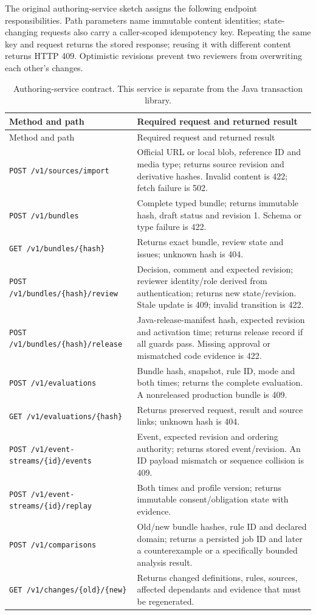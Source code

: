 The original authoring-service sketch assigns the following endpoint responsibilities. Path parameters name
immutable content identities; state-changing requests also carry a caller-scoped
idempotency key. Repeating the same key and request returns the stored response;
reusing it with different content returns HTTP 409. Optimistic revisions prevent
two reviewers from overwriting each other's changes.
\begingroup\small
\begin{longtable}{P{0.36\textwidth}P{0.54\textwidth}}
\caption{Authoring-service contract. This service is separate from the Java
transaction library.}\\
\toprule Method and path & Required request and returned result \\\midrule
\endfirsthead
\toprule Method and path & Required request and returned result \\\midrule
\endhead
\texttt{POST /v1/sources/import} & Official URL or local blob, reference ID and media type; returns source revision and derivative hashes. Invalid content is 422; fetch failure is 502.\\
\texttt{POST /v1/bundles} & Complete typed bundle; returns immutable hash, draft status and revision 1. Schema or type failure is 422.\\
\texttt{GET /v1/bundles/\{hash\}} & Returns exact bundle, review state and issues; unknown hash is 404.\\
\texttt{POST /v1/bundles/\{hash\}/review} & Decision, comment and expected revision; reviewer identity/role derived from authentication; returns new state/revision. Stale update is 409; invalid transition is 422.\\
\texttt{POST /v1/bundles/\{hash\}/release} & Java-release-manifest hash, expected revision and activation time; returns release record if all guards pass. Missing approval or mismatched code evidence is 422.\\
\texttt{POST /v1/evaluations} & Bundle hash, snapshot, rule ID, mode and both times; returns the complete evaluation. A nonreleased production bundle is 409.\\
\texttt{GET /v1/evaluations/\{hash\}} & Returns preserved request, result and source links; unknown hash is 404.\\
\texttt{POST /v1/event-streams/\{id\}/events} & Event, expected revision and ordering authority; returns stored event/revision. An ID payload mismatch or sequence collision is 409.\\
\texttt{POST /v1/event-streams/\{id\}/replay} & Both times and profile version; returns immutable consent/obligation state with evidence.\\
\texttt{POST /v1/comparisons} & Old/new bundle hashes, rule ID and declared domain; returns a persisted job ID and later a counterexample or a specifically bounded analysis result.\\
\texttt{GET /v1/changes/\{old\}/\{new\}} & Returns changed definitions, rules, sources, affected dependants and evidence that must be regenerated.\\
\bottomrule
\end{longtable}
\endgroup

